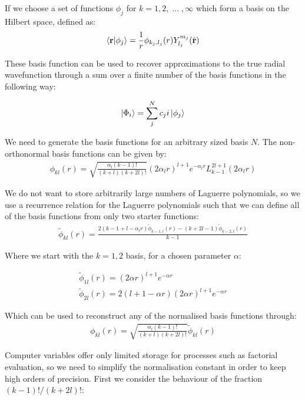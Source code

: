 \documentclass{article}
\renewcommand{\vec}[1]{\mathbf{#1}}
\let\oldhat\hat
\renewcommand{\hat}[1]{\oldhat{\mathbf{#1}}}
\begin{document}
    If we choose a set of functions $\phi_{j}$ for $k={1,2,\; ...\;, \infty}$ which form a basis on the Hilbert space, defined as:
    \large
    \begin{gather}
    	\braket{\vec{r}}{\phi_j} = \frac{1}{r}\phi_{k_j,l_j}(r)Y^{m_j}_{l_j}(\hat{\vec{r}})
    \end{gather}
    \normalsize
    
    These basis function can be used to recover approximations to the true radial wavefunction through a sum over a finite number of the basis functions in the following way:
   
    \large
    \begin{gather}
    	\ket{\Phi_i} = \sum_{j}^{N} c_ji \ket{\phi_j}
    \end{gather}
    \normalsize
    
    We need to generate the basis functions for an arbitrary sized basis $N$.
    The non-orthonormal basis functions can be given by:
    \begin{gather}
    	\phi_{kl}(r) = \sqrt{\frac{\alpha_l (k-1)!}{(k+l)(k+2l)!}}(2\alpha_l r)^{l+1} e^{-\alpha_l r} L^{2l+1}_{k-1}(2\alpha_l r)
    \end{gather}
    
    We do not want to store arbitrarily large numbers of Laguerre polynomials, so we use a recurrence relation for the Laguerre polynomials such that we can define all of the basis functions from only two starter functions:
    \begin{gather}
    	\tilde{\phi}_{kl}(r) = \frac{2(k-1+l-\alpha_lr)\tilde{\phi}_{k-1,l}(r) - (k+2l-1)\tilde{\phi}_{k-2,l}(r)}{k-1}
    \end{gather}
    
    Where we start with the $k=1,2$ basis, for a chosen parameter $\alpha$:
    
    \begin{gather}
    	\tilde{\phi}_{1l}(r) = (2\alpha r)^{l+1}e^{-\alpha r}\\
    	\tilde{\phi}_{2l}(r) = 2(l+1-\alpha r)(2\alpha r)^{l+1}e^{-\alpha r}
    \end{gather}
    
    Which can be used to reconstruct any of the normalised basis functions through:
    \begin{gather}
    	\phi_{kl}(r) = \sqrt{\frac{\alpha_l (k-1)!}{(k+l)(k+2l)!}}\tilde{\phi}_{kl}(r)
    \end{gather}
    
    Computer variables offer only limited storage for processes such as factorial evaluation, so we need to simplify the normalisation constant in order to keep high orders of precision. First we consider the behaviour of the fraction
    $(k-1)!/(k+2l)!$:
    
\end{document}
